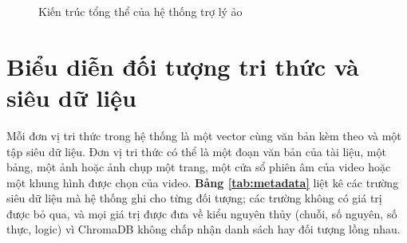 \begin{figure}[ht]
    \centering
    
    \caption{Kiến trúc tổng thể của hệ thống trợ lý ảo}
    \label{fig:kien-truc}
\end{figure}


\section{Biểu diễn đối tượng tri thức và siêu dữ liệu}\label{sec:bieu-dien}

Mỗi đơn vị tri thức trong hệ thống là một vector cùng văn bản kèm theo và một tập siêu dữ liệu. Đơn vị tri thức có thể là một đoạn văn bản của tài liệu, một bảng, một ảnh hoặc ảnh chụp một trang, một cửa sổ phiên âm của video hoặc một khung hình được chọn của video. \textbf{Bảng \ref{tab:metadata}} liệt kê các trường siêu dữ liệu mà hệ thống ghi cho từng đối tượng; các trường không có giá trị được bỏ qua, và mọi giá trị được đưa về kiểu nguyên thủy (chuỗi, số nguyên, số thực, logic) vì ChromaDB không chấp nhận danh sách hay đối tượng lồng nhau.

